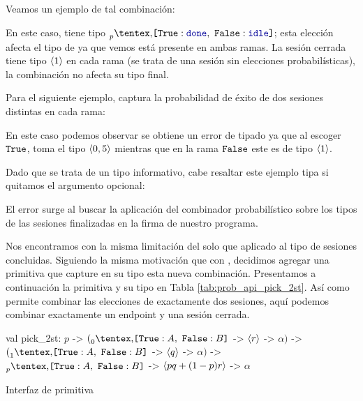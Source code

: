 Veamos un ejemplo de tal combinación:

\PickIdleCloseRunEchoClient

En este caso,  tiene tipo $\BinaryPChoice[p]{\Done}{\Idle}$; esta
elección afecta el tipo de  ya que vemos está presente en ambas ramas.
La sesión cerrada  tiene tipo $\ClosedSessionType[1]$ en cada rama (se
trata de una sesión sin elecciones probabilísticas), la combinación no afecta
su tipo final.

Para el siguiente ejemplo,  captura la probabilidad de éxito de dos
sesiones distintas en cada rama:

\InvalidPickIdleCloseRunEchoClientOrCoinFlip

En este caso podemos observar se obtiene un error de tipado ya que al escoger
$\Tag[True]$,  toma el tipo $\ClosedSessionType[0,5]$ mientras que en
la rama $\Tag[False]$ este es de tipo $\ClosedSessionType[1]$.

Dado que se trata de un tipo informativo, cabe resaltar este ejemplo tipa si
quitamos el argumento opcional:

\NoOptionalValidPickIdleCloseRunEchoClientOrCoinFlip

El error surge al buscar la aplicación del combinador probabilístico sobre los
tipos de las sesiones finalizadas en la firma de nuestro programa.

Nos encontramos con la misma limitación del  solo que aplicado al tipo
de sesiones concluidas. Siguiendo la misma motivación que con ,
decidimos agregar una primitiva que capture en su tipo esta nueva combinación.
Presentamos a continuación la primitiva  y su tipo en Tabla
\ref{tab:prob_api_pick_2st}. Así como  permite combinar las
elecciones de exactamente dos sesiones, aquí podemos combinar exactamente un
endpoint y una sesión cerrada.

\begin{table}[htb]
\begin{OCamlD}[frame=single]
	val pick_2st:
	    $p$ -> $(\BinaryPChoice[0]{\etvarA}{\etvarB}$ -> $\ClosedSessionType[r]$ -> $\alpha)$
	      -> $(\BinaryPChoice[1]{\etvarA}{\etvarB}$ -> $\ClosedSessionType[q]$ -> $\alpha)$
	      -> $\BinaryPChoice[p]{\etvarA}{\etvarB}$ -> $\ClosedSessionType[pq + (1 - p)r]$ -> $\alpha$
\end{OCamlD}
\caption{Interfaz de primitiva }
\label{tab:prob_api_pick_2st}
\end{table}


